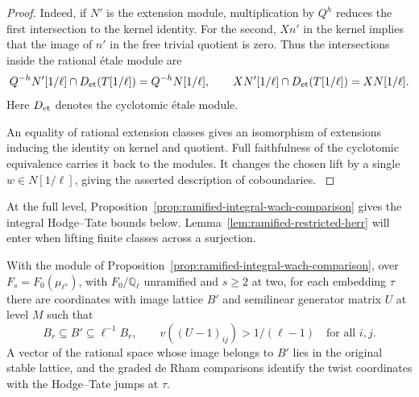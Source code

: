 \begin{proof}
Indeed, if \(N'\) is the extension module, multiplication by \(Q^h\) reduces the first intersection to the kernel identity. For the second, \(Xn'\) in the kernel implies that the image of \(n'\) in the free trivial quotient is zero. Thus the intersections inside the rational étale module are
\[
 Q^{-h}N'[1/\ell]\cap D_{\rm et}(T[1/\ell])=Q^{-h}N[1/\ell],
 \qquad XN'[1/\ell]\cap D_{\rm et}(T[1/\ell])=XN[1/\ell].
\]
Here \(D_{\rm et}\) denotes the cyclotomic étale module.

An equality of rational extension classes gives an isomorphism of extensions inducing the identity on kernel and quotient. Full faithfulness of the cyclotomic equivalence carries it back to the modules. It changes the chosen lift by a single \(w\in N[1/\ell]\), giving the asserted description of coboundaries. \cite[Corollaries~2.4.4 and~3.3.8]{kisin-ren-lubin-tate}
\end{proof}

At the full level, Proposition~\ref{prop:ramified-integral-wach-comparison} gives the integral Hodge--Tate bounds below. Lemma~\ref{lem:ramified-restricted-herr} will enter when lifting finite classes across a surjection.\label{cor:ramified-cyclotomic-1}

\begin{proposition}\label{prop:full-level-ht-coordinates}
With the module of Proposition~\ref{prop:ramified-integral-wach-comparison}, over \(F_s=F_0(\mu_{\ell^s})\), with \(F_0/\mathbb Q_\ell\)
unramified and \(s\ge2\) at two, for each embedding \(\tau\)
there are coordinates with image lattice \(B'\) and semilinear generator matrix \(U\) at level \(M\) such that
\[
 B_r\subseteq B'\subseteq\ell^{-1}B_r,\qquad v((U-1)_{ij})>1/(\ell-1)\quad\text{for all }i,j.
\] A vector of the rational
space whose image belongs to \(B'\) lies in the original
stable lattice, and the graded de Rham comparisons identify
the twist coordinates with the Hodge--Tate jumps at \(\tau\).
\end{proposition}

